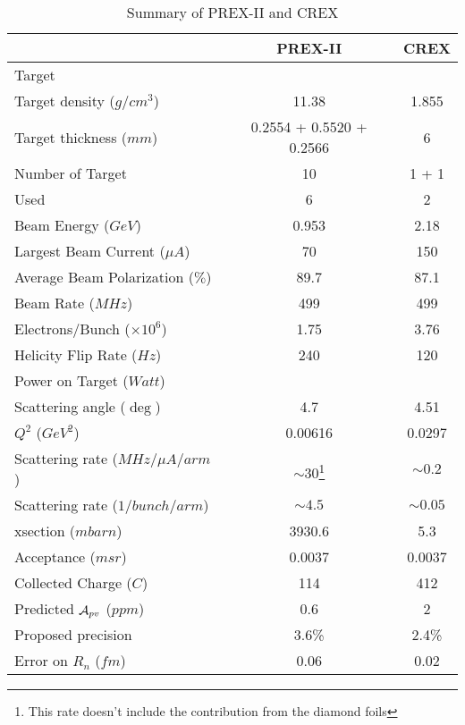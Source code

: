 \begin{table}[h]
    \centering
    \begin{tabular}{l | c c }
	\hline
	&   PREX-II & CREX  \\
	\hline
	Target	& \Pb	& \Ca	\\
	Target density ($g/cm^3$)   & 11.38 & 1.855	\\
	Target thickness ($mm$)	& 0.2554 + 0.5520 + 0.2566	& 6	\\
	Number of Target & 10 & 1 + 1	\\
	Used	& 6 & 2	\\
	\hline
	Beam Energy ($GeV$) & 0.953 & 2.18  \\
	Largest Beam Current ($\mu A$)	& 70	& 150	\\
	Average Beam Polarization ($\%$) & 89.7   & 87.1   \\
	Beam Rate ($MHz$) & 499	& 499 \\
	Electrons/Bunch	($\times 10^6$)	& 1.75	& 3.76	\\
	Helicity Flip Rate ($Hz$)  & 240   & 120   \\
	Power on Target ($Watt$)	&   &	\\
	\hline
	Scattering angle ($\deg$)   & 4.7	& 4.51 \\
	$Q^2$ ($GeV^2$)	& 0.00616   & 0.0297	\\
	Scattering rate ($MHz/\mu A/arm$)   & $\sim 30$\footnote{This rate doesn't include the contribution from the diamond foils}   & $\sim0.2$ \\
	Scattering rate ($1/bunch/arm$)   & $\sim 4.5$   & $\sim 0.05$ \\
	xsection ($mbarn$)    & 3930.6	& 5.3   \\
	Acceptance ($msr$)    &	0.0037 & 0.0037  \\
	\hline
	Collected Charge ($C$)	& 114	& 412	\\
	\hline
	Predicted $\mathcal{A}_{pv}$ ($ppm$)	& 0.6   & 2 \\
	Proposed precision  & 3.6\%   & 2.4\% \\
	Error on $R_n$ ($fm$)	& 0.06	& 0.02	\\
	\hline
    \end{tabular}
    \caption{Summary of PREX-II and CREX}
    \label{tab:parameters}
\end{table}
\begin{comment}
    crex rate: https://logbooks.jlab.org/entry/3748863
\end{comment}

